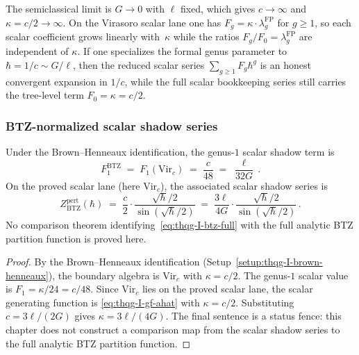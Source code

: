 \begin{remark}
\label{rem:thqg-I-semiclassical}
The semiclassical limit is $G \to 0$ with $\ell$ fixed, which gives
$c \to \infty$ and $\kappa=c/2 \to \infty$. On the Virasoro scalar
lane one has $F_g = \kappa \cdot \lambda_g^{\mathrm{FP}}$ for $g \geq
1$, so each scalar coefficient grows linearly with~$\kappa$ while the
ratios $F_g/F_0 = \lambda_g^{\mathrm{FP}}$ are independent of
$\kappa$. If one specializes the formal genus parameter to
$\hbar = 1/c \sim G/\ell$, then the reduced scalar series
$\sum_{g \geq 1} F_g \hbar^g$ is an honest convergent expansion in
$1/c$, while the full scalar bookkeeping series still carries the
tree-level term $F_0=\kappa=c/2$.
\end{remark}

\subsubsection{BTZ-normalized scalar shadow series}

\begin{theorem}
\label{thm:thqg-I-btz}
Under the Brown--Henneaux identification, the genus-$1$ scalar shadow
term is
\begin{equation}\label{eq:thqg-I-btz-F1}
F_1^{\mathrm{BTZ}} \;=\; F_1(\mathrm{Vir}_c) \;=\; \frac{c}{48} \;=\; \frac{\ell}{32G}\,.
\end{equation}
On the proved scalar lane \textup{(}here $\mathrm{Vir}_c$\textup{)}, the
associated scalar shadow series is
\begin{equation}\label{eq:thqg-I-btz-full}
Z_{\mathrm{BTZ}}^{\mathrm{pert}}(\hbar) \;=\; \frac{c}{2} \cdot \frac{\sqrt{\hbar}/2}{\sin(\sqrt{\hbar}/2)} \;=\; \frac{3\ell}{4G} \cdot \frac{\sqrt{\hbar}/2}{\sin(\sqrt{\hbar}/2)}\,.
\end{equation}
No comparison theorem identifying~\eqref{eq:thqg-I-btz-full} with the
full analytic BTZ partition function is proved here.
\end{theorem}

\begin{proof}
By the Brown--Henneaux identification
(Setup~\ref{setup:thqg-I-brown-henneaux}), the boundary algebra is
$\mathrm{Vir}_c$ with $\kappa = c/2$. The genus-$1$ scalar value is
$F_1 = \kappa/24 = c/48$. Since $\mathrm{Vir}_c$ lies on the proved
scalar lane, the scalar generating function is
\eqref{eq:thqg-I-gf-ahat} with $\kappa = c/2$. Substituting
$c = 3\ell/(2G)$ gives $\kappa = 3\ell/(4G)$. The final sentence is a
status fence: this chapter does not construct a comparison map from the
scalar shadow series to the full analytic BTZ partition function.
\end{proof}

